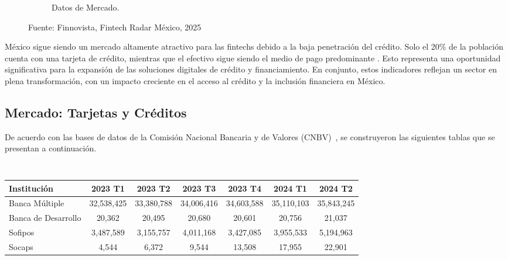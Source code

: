 \begin{figure}[h!]
\begin{subfigure}[b]{0.45\textwidth}
        \caption{Datos de Mercado.}
        \label{fig:datmerca}
    \end{subfigure}
    \caption{Fuente: Finnovista,  Fintech Radar México, 2025}
    \label{fig:figure1}
\end{figure}

México sigue siendo un mercado altamente atractivo para las fintechs debido a la baja penetración del crédito. Solo el 20\% de la población cuenta con una tarjeta de crédito, mientras que el efectivo sigue siendo el medio de pago predominante \cite{elfinanciero2024}. Esto representa una oportunidad significativa para la expansión de las soluciones digitales de crédito y financiamiento. En conjunto, estos indicadores reflejan un sector en plena transformación, con un impacto creciente en el acceso al crédito y la inclusión financiera en México.

\subsection*{Mercado: Tarjetas y Créditos}
De acuerdo con las bases de datos de la Comisión Nacional Bancaria y de Valores (CNBV)~\cite{cnbv_inclusion_2024}, se construyeron las siguientes tablas que se presentan a continuación.

\begin{table}[h!]
    \centering
    \caption{\textcolor{white}{Número de tarjetas de crédito por tipo de institución (trimestral)}}
    \color{white}
    \begin{tabular}{lcccccc}
        \hline
        \textbf{Institución} & \textbf{2023 T1} & \textbf{2023 T2} & \textbf{2023 T3} & \textbf{2023 T4} & \textbf{2024 T1} & \textbf{2024 T2} \\
        \hline
        Banca Múltiple       &        32,538,425         &        33,380,788         &       34,006,416          &       34,603,588          &        35,110,103         &        35,843,245    \\
        Banca de Desarrollo  &       20,362         &          20,495       &        20,680         &         20,601        &        20,756         &        21,037        \\
        Sofipos              &     3,487,589         &         3,155,757        &        4,011,168         &        3,427,085         &        3,955,533         &        5,194,963      \\
        Socaps               &       4,544          &           6,372      &       9,544          &         13,508        &        17,955         &            22,901     \\
        \hline
    \end{tabular}
    \label{tab:creditos_trimestrales}
\end{table}

